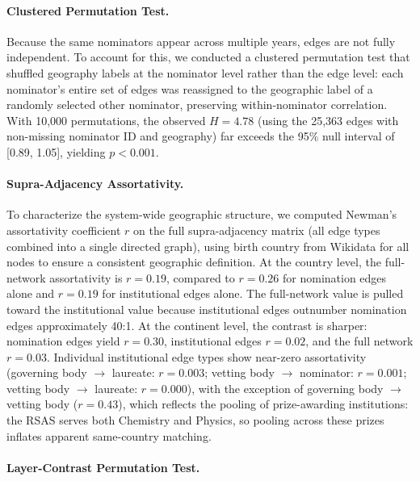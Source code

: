 \documentclass[12pt]{article}
\begin{document}
\paragraph*{Clustered Permutation Test.}

Because the same nominators appear across multiple years, edges are not fully independent. To account for this, we conducted a clustered permutation test that shuffled geography labels at the nominator level rather than the edge level: each nominator's entire set of edges was reassigned to the geographic label of a randomly selected other nominator, preserving within-nominator correlation. With 10,000 permutations, the observed $H = 4.78$ (using the 25,363 edges with non-missing nominator ID and geography) far exceeds the 95\% null interval of [0.89, 1.05], yielding $p < 0.001$.

\paragraph*{Supra-Adjacency Assortativity.}

To characterize the system-wide geographic structure, we computed Newman's assortativity coefficient $r$ on the full supra-adjacency matrix (all edge types combined into a single directed graph), using birth country from Wikidata for all nodes to ensure a consistent geographic definition. At the country level, the full-network assortativity is $r = 0.19$, compared to $r = 0.26$ for nomination edges alone and $r = 0.19$ for institutional edges alone. The full-network value is pulled toward the institutional value because institutional edges outnumber nomination edges approximately 40:1. At the continent level, the contrast is sharper: nomination edges yield $r = 0.30$, institutional edges $r = 0.02$, and the full network $r = 0.03$. Individual institutional edge types show near-zero assortativity (governing body $\to$ laureate: $r = 0.003$; vetting body $\to$ nominator: $r = 0.001$; vetting body $\to$ laureate: $r = 0.000$), with the exception of governing body $\to$ vetting body ($r = 0.43$), which reflects the pooling of prize-awarding institutions: the RSAS serves both Chemistry and Physics, so pooling across these prizes inflates apparent same-country matching.

\paragraph*{Layer-Contrast Permutation Test.}
\end{document}
